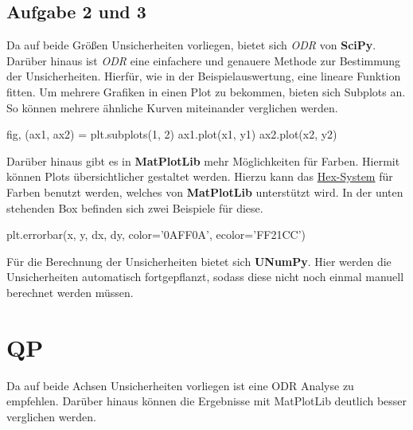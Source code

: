 \documentclass[a4paper,12pt]{article}
\begin{document}
\subsection{Aufgabe 2 und 3}
Da auf beide Größen Unsicherheiten vorliegen, bietet sich \textit{ODR} von \textbf{SciPy}. Darüber hinaus ist \textit{ODR} eine einfachere und genauere Methode zur Bestimmung der Unsicherheiten. Hierfür, wie in der Beispielauswertung, eine lineare Funktion fitten. \newline
Um mehrere Grafiken in einen Plot zu bekommen, bieten sich Subplots an. So können mehrere ähnliche Kurven miteinander verglichen werden. 
\begin{center}
\begin{tcolorbox}[colback=gray!20, colframe=black, width=1\textwidth, boxrule=1pt, arc=1mm]
fig, (ax1, ax2) = plt.subplots(1, 2) \newline
ax1.plot(x1, y1) \newline
ax2.plot(x2, y2)
\end{tcolorbox}
\end{center}
Darüber hinaus gibt es in \textbf{MatPlotLib} mehr Möglichkeiten für Farben. Hiermit können Plots übersichtlicher gestaltet werden. Hierzu kann das \href{https://www.rapidtables.org/de/web/color/html-color-codes.html}{Hex-System} für Farben benutzt werden, welches von \textbf{MatPlotLib} unterstützt wird. In der unten stehenden Box befinden sich zwei Beispiele für diese.
\begin{center}
\begin{tcolorbox}[colback=gray!20, colframe=black, width=1\textwidth, boxrule=1pt, arc=1mm]
plt.errorbar(x, y, dx, dy, color='0AFF0A', ecolor='FF21CC')
\end{tcolorbox}
\end{center}
Für die Berechnung der Unsicherheiten bietet sich \textbf{UNumPy}. Hier werden die Unsicherheiten automatisch fortgepflanzt, sodass diese nicht noch einmal manuell berechnet werden müssen.



\section{QP}

\begin{center}
\begin{tcolorbox}[colback=gray!20, colframe=red, width=0.8\textwidth, boxrule=1pt, arc=1mm]
Da auf beide Achsen Unsicherheiten vorliegen ist eine ODR Analyse zu empfehlen. Darüber hinaus können die Ergebnisse mit MatPlotLib deutlich besser verglichen werden.
\end{tcolorbox}
\end{center}
\end{document}
